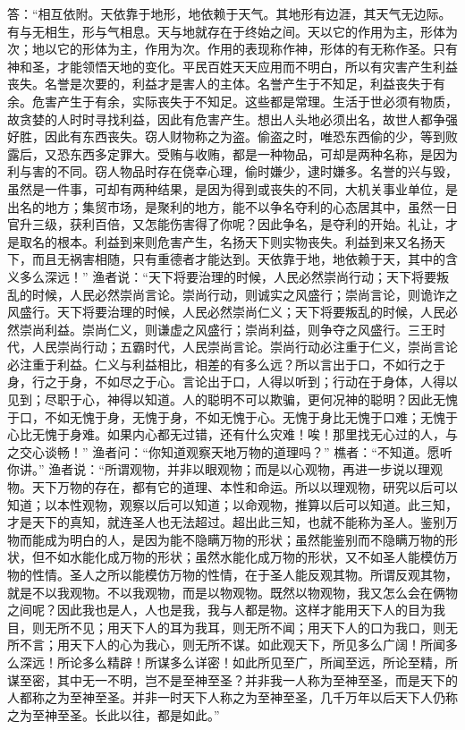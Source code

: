 \documentclass[12pt,UTF8]{ctexbook}
\begin{document}
答：“相互依附。天依靠于地形，地依赖于天气。其地形有边涯，其天气无边际。有与无相生，形与气相息。天与地就存在于终始之间。天以它的作用为主，形体为次；地以它的形体为主，作用为次。作用的表现称作神，形体的有无称作圣。只有神和圣，才能领悟天地的变化。平民百姓天天应用而不明白，所以有灾害产生利益丧失。名誉是次要的，利益才是害人的主体。名誉产生于不知足，利益丧失于有余。危害产生于有余，实际丧失于不知足。这些都是常理。生活于世必须有物质，故贪婪的人时时寻找利益，因此有危害产生。想出人头地必须出名，故世人都争强好胜，因此有东西丧失。窃人财物称之为盗。偷盗之时，唯恐东西偷的少，等到败露后，又恐东西多定罪大。受贿与收贿，都是一种物品，可却是两种名称，是因为利与害的不同。窃人物品时存在侥幸心理，偷时嫌少，逮时嫌多。名誉的兴与毁，虽然是一件事，可却有两种结果，是因为得到或丧失的不同，大机关事业单位，是出名的地方；集贸市场，是聚利的地方，能不以争名夺利的心态居其中，虽然一日官升三级，获利百倍，又怎能伤害得了你呢？因此争名，是夺利的开始。礼让，才是取名的根本。利益到来则危害产生，名扬天下则实物丧失。利益到来又名扬天下，而且无祸害相随，只有重德者才能达到。天依靠于地，地依赖于天，其中的含义多么深远！”
渔者说：“天下将要治理的时候，人民必然崇尚行动；天下将要叛乱的时候，人民必然崇尚言论。崇尚行动，则诚实之风盛行；崇尚言论，则诡诈之风盛行。天下将要治理的时候，人民必然崇尚仁义；天下将要叛乱的时候，人民必然崇尚利益。崇尚仁义，则谦虚之风盛行；崇尚利益，则争夺之风盛行。三王时代，人民崇尚行动；五霸时代，人民崇尚言论。崇尚行动必注重于仁义，崇尚言论必注重于利益。仁义与利益相比，相差的有多么远？所以言出于口，不如行之于身，行之于身，不如尽之于心。言论出于口，人得以听到；行动在于身体，人得以见到；尽职于心，神得以知道。人的聪明不可以欺骗，更何况神的聪明？因此无愧于口，不如无愧于身，无愧于身，不如无愧于心。无愧于身比无愧于口难；无愧于心比无愧于身难。如果内心都无过错，还有什么灾难！唉！那里找无心过的人，与之交心谈畅！”
渔者问：“你知道观察天地万物的道理吗？”
樵者：“不知道。愿听你讲。”
渔者说：“所谓观物，并非以眼观物；而是以心观物，再进一步说以理观物。天下万物的存在，都有它的道理、本性和命运。所以以理观物，研究以后可以知道；以本性观物，观察以后可以知道；以命观物，推算以后可以知道。此三知，才是天下的真知，就连圣人也无法超过。超出此三知，也就不能称为圣人。鉴别万物而能成为明白的人，是因为能不隐瞒万物的形状；虽然能鉴别而不隐瞒万物的形状，但不如水能化成万物的形状；虽然水能化成万物的形状，又不如圣人能模仿万物的性情。圣人之所以能模仿万物的性情，在于圣人能反观其物。所谓反观其物，就是不以我观物。不以我观物，而是以物观物。既然以物观物，我又怎么会在俩物之间呢？因此我也是人，人也是我，我与人都是物。这样才能用天下人的目为我目，则无所不见；用天下人的耳为我耳，则无所不闻；用天下人的口为我口，则无所不言；用天下人的心为我心，则无所不谋。如此观天下，所见多么广阔！所闻多么深远！所论多么精辟！所谋多么详密！如此所见至广，所闻至远，所论至精，所谋至密，其中无一不明，岂不是至神至圣？并非我一人称为至神至圣，而是天下的人都称之为至神至圣。并非一时天下人称之为至神至圣，几千万年以后天下人仍称之为至神至圣。长此以往，都是如此。”
\end{document}
